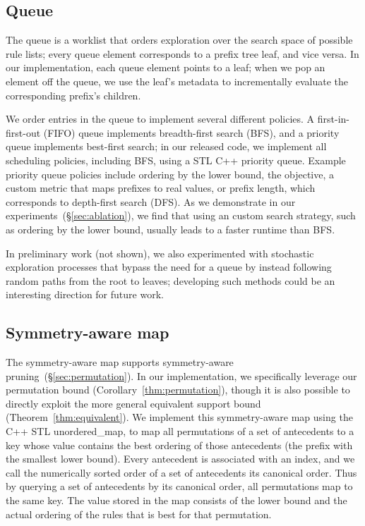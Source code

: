 \subsection{Queue}
\label{sec:queue}

The queue is a worklist that orders exploration over the search space of possible
rule lists; every queue element corresponds to a prefix tree leaf, and vice versa.
%
In our implementation, each queue element points to a leaf;
when we pop an element off the queue, we use the leaf's metadata to
incrementally evaluate the corresponding prefix's children.

We order entries in the queue to implement several different policies.
%
A first-in-first-out (FIFO) queue implements breadth-first search (BFS),
and a priority queue implements best-first search; in our released code,
we implement all scheduling policies, including BFS, using a STL C++ priority queue.
%
Example priority queue policies include ordering
by the lower bound, the objective, a custom metric that maps prefixes to real values,
or prefix length, which corresponds to depth-first search (DFS).
%
As we demonstrate in our experiments~(\S\ref{sec:ablation}),
we find that using an custom search strategy,
such as ordering by the lower bound, usually leads to a faster runtime than BFS.

In preliminary work (not shown), we also experimented with
stochastic exploration processes that bypass the need for a queue
by instead following random paths from the root to leaves;
developing such methods could be an interesting direction for future work.

\subsection{Symmetry-aware map}
\label{sec:pmap}

The symmetry-aware map supports symmetry-aware pruning~(\S\ref{sec:permutation}).
%
In our implementation, we specifically leverage our permutation bound
(Corollary~\ref{thm:permutation}), though it is also possible to directly
exploit the more general equivalent support bound (Theorem~\ref{thm:equivalent}).
%
We implement this symmetry-aware map using the C++ STL unordered\_map,
to map all permutations of a set of antecedents to a key whose value contains
the best ordering of those antecedents (\ie the prefix with the smallest lower bound).
%
Every antecedent is associated with an index, and we call the numerically
sorted order of a set of antecedents its canonical order.
%
Thus by querying a set of antecedents by its canonical order,
all permutations map to the same key.
%
The value stored in the map consists of the lower bound and the actual ordering
of the rules that is best for that permutation.

